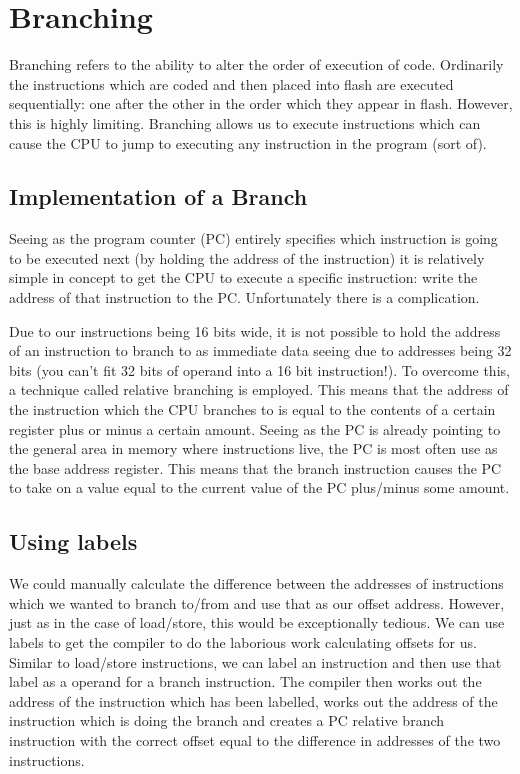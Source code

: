 \chapter{Branching}
Branching refers to the ability to alter the order of execution of code. Ordinarily the instructions which are coded and then placed into flash are executed sequentially: one after the other in the order which they appear in flash. However, this is highly limiting. Branching allows us to execute instructions which can cause the CPU to jump to executing any instruction in the program (sort of). 

\section{Implementation of a Branch}
Seeing as the program counter (PC) entirely specifies which instruction is going to be executed next (by holding the address of the instruction) it is relatively simple in concept to get the CPU to execute a specific instruction: write the address of that instruction to the PC. Unfortunately there is a complication.

Due to our instructions being 16 bits wide, it is not possible to hold the address of an instruction to branch to as immediate data seeing due to addresses being 32 bits (you can't fit 32 bits of operand into a 16 bit instruction!).
To overcome this, a technique called relative branching is employed. This means that the address of the instruction which the CPU branches to is equal to the contents of a certain register plus or minus a certain amount. Seeing as the PC is already pointing to the general area in memory where instructions live, the PC is most often use as the base address register. This means that the branch instruction causes the PC to take on a value equal to the current value of the PC plus/minus some amount. 

\section{Using labels}
We could manually calculate the difference between the addresses of instructions which we wanted to branch to/from and use that as our offset address. However, just as in the case of load/store, this would be exceptionally tedious. We can use labels to get the compiler to do the laborious work calculating offsets for us. Similar to load/store instructions, we can label an instruction and then use that label as a operand for a branch instruction. The compiler then works out the address of the instruction which has been labelled, works out the address of the instruction which is doing the branch and creates a PC relative branch instruction with the correct offset equal to the difference in addresses of the two instructions. 

